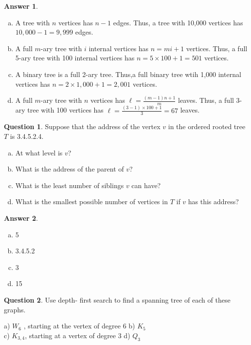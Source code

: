 \documentclass[article, 12pt]{article}
\theoremstyle{definition}
\newtheorem{question}{Question}
\newtheorem{answer}{Answer}
\begin{document}
    \begin{answer} \
        \label{a2}
        \begin{enumerate}[a)] 
            \item A tree with $n$ vertices has $n-1$ edges. Thus, a tree with 10,000 vertices has $10,000-1=9,999$ edges.
            \item A full $m$-ary tree with $i$ internal vertices has $n=mi+1$ vertices. Thus, a full 5-ary tree with 100 internal vertices has $n=5\times 100+1=501$ vertices.
            \item A binary tree is a full 2-ary tree. Thus,a full binary tree wtih 1,000 internal vertices has $n=2\times 1,000+1=2,001$ vertices.
            \item A full $m$-ary tree with $n$ vertices has $\ell = \frac{(m-1)n + 1}{m}$ leaves. Thus, a full 3-ary tree with 100 vertices has $\ell = \frac{(3-1)\times 100 + 1}{3}=67$ leaves.
        \end{enumerate}
    \end{answer}

    \begin{question}
        \label{q3}
        Suppose that the address of the vertex $v$ in the ordered rooted tree $T$ is 3.4.5.2.4. 
        \begin{enumerate}[a)]
            \item At what level is $v$?
            \item What is the address of the parent of $v$?
            \item What is the least number of siblings $v$ can have?
            \item What is the smallest possible number of vertices in $T$ if $v$ has this address?
        \end{enumerate}
    \end{question}

    \begin{answer} \
        \label{a3}
        \begin{enumerate}[a)]
            \item 5
            \item 3.4.5.2
            \item 3
            \item 15
        \end{enumerate}
    \end{answer}

    \begin{question}
        \label{q4}
        Use depth- first search to find a spanning tree of each of these graphs. 

        a) $W_6$ , starting at the vertex of degree 6\hskip 2cm b) $K_5$ \\ c) $K_{3,4}$, starting at a vertex of degree 3 \hskip2.2cm d) $Q_3$
    \end{question}
\end{document}
